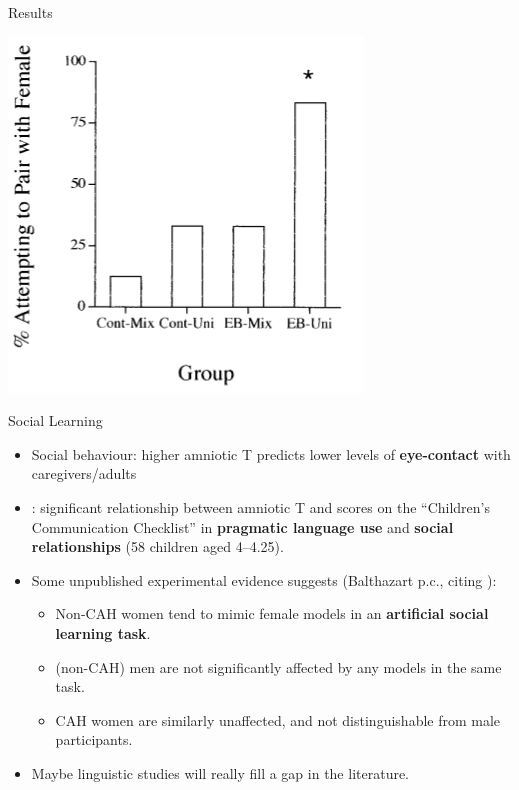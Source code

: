 \documentclass[hyperref={pdfpagelabels=false}]{beamer}
\begin{document}
\begin{frame}{\citet{mansukhanietal1996}}
\begin{block}{Results}
\begin{center}
	\includegraphics[width=.7\textwidth]{figures/gaybirds.png}
	\end{center}
\end{block}
\end{frame}

\begin{frame}{Social Learning}
\begin{itemize}

	\item Social behaviour: higher amniotic T predicts lower levels of \textbf{eye-contact} with caregivers/adults \citep{lutchmayaetal2002}
	\item \citet{knickmeyeretal2005}: significant relationship between amniotic T and scores on the ``Children's Communication Checklist'' in \textbf{pragmatic language use} and \textbf{social relationships} (58 children aged 4--4.25).
	\item Some unpublished experimental evidence suggests (Balthazart p.c., citing \citealt{hines2012}):
		\begin{itemize}
			\item Non-CAH women tend to mimic female models in an \textbf{artificial social learning task}.
			\item (non-CAH) men are not significantly affected by any models in the same task.
			\item CAH women are similarly unaffected, and not distinguishable from male participants.
		\end{itemize}
	\item Maybe linguistic studies will really fill a gap in the literature.
\end{itemize}

\end{frame}
\end{document}
